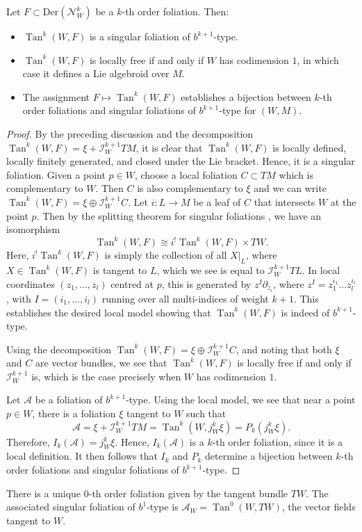 \documentclass[10pt]{amsart}
\newcommand{\Tan}{{\operatorname{Tan}}}
\numberwithin{theoremalpha}{section}
\numberwithin{equation}{section}
\numberwithin{definition}{section}
\numberwithin{theorem}{section}
\numberwithin{proposition}{section}
\numberwithin{lemma}{section}
\numberwithin{example}{section}
\numberwithin{remark}{section}
\numberwithin{corollary}{section}
\numberwithin{question}{section}
\numberwithin{problem}{section}
\numberwithin{assumption}{section}
\theoremstyle{named}
\numberwithin{equation}{section}
\begin{document}
\begin{proposition} \label{Singfoliskorderfol}
Let $F \subset \mathrm{Der}(\mathcal{N}_{W}^{k})$ be a $k$-th order foliation. Then:
\begin{itemize}
\item[a)] $\Tan^{k}(W, F)$ is a singular foliation of $b^{k+1}$-type.
\item[b)] $\Tan^{k}(W, F)$ is locally free if and only if $W$ has codimension $1$, in which case it defines a Lie algebroid over $M$.
\item[c)] The assignment $F \mapsto \Tan^{k}(W, F)$ establishes a bijection between $k$-th order foliations and singular foliations of $b^{k+1}$-type for $(W,M)$. 
\end{itemize}
\end{proposition}
\begin{proof}
By the preceding discussion and the decomposition $\Tan^{k}(W, F) = \xi + \mathcal{I}_W^{k+1} TM$, it is clear that $\Tan^{k}(W, F) $ is locally defined, locally finitely generated, and closed under the Lie bracket. Hence, it is a singular foliation. Given a point $p \in W$, choose a local foliation $C \subset TM$ which is complementary to $W$. Then $C$ is also complementary to $\xi$ and we can write $\Tan^{k}(W, F) = \xi \oplus \mathcal{I}_W^{k+1}C$. Let $i: L \to M$ be a leaf of $C$ that intersects $W$ at the point $p$. Then by the splitting theorem for singular foliations \cite{MR4065067}, we have an isomorphism 
\[
\Tan^{k}(W, F) \cong i^{!}\Tan^{k}(W, F) \times TW. 
\] 
Here, $i^{!}\Tan^{k}(W,F)$ is simply the collection of all $X|_{L}$, where $X \in \Tan^{k}(W, F)$ is tangent to $L$, which we see is equal to $\mathcal{I}_W^{k+1}TL$. In local coordinates $(z_{1}, ..., z_{l})$ centred at $p$, this is generated by $z^{I} \partial_{z_{i}}$, where $z^{I} = z_{1}^{i_{1}} ... z_{l}^{i_{l}}$, with $I = (i_{1}, ..., i_{l})$ running over all multi-indices of weight $k+1$. This establishes the desired local model showing that $\Tan^{k}(W, F)$ is indeed of $b^{k+1}$-type. 

Using the decomposition $\Tan^{k}(W, F) = \xi \oplus \mathcal{I}_W^{k+1}C$, and noting that both $\xi$ and $C$ are vector bundles, we see that $\Tan^{k}(W, F)$ is locally free if and only if $\mathcal{I}_W^{k+1}$ is, which is the case precisely when $W$ has codimension $1$. 

Let $\mathcal{A}$ be a foliation of $b^{k+1}$-type. Using the local model, we see that near a point $p \in W$, there is a foliation $\xi$ tangent to $W$ such that 
\[
\mathcal{A} = \xi + \mathcal{I}_W^{k+1} TM = \Tan^{k}(W, j_{W}^{k}\xi) = P_{k}(j_{W}^{k}\xi). 
\]
Therefore, $I_{k}(\mathcal{A}) = j^{k}_{W}\xi$. Hence, $I_{k}(\mathcal{A})$ is a $k$-th order foliation, since it is a local definition. It then follows that $I_{k}$ and $P_{k}$ determine a bijection between $k$-th order foliations and singular foliations of $b^{k+1}$-type. 
\end{proof}
\begin{remark}
There is a unique $0$-th order foliation given by the tangent bundle $TW$. The associated singular foliation of $b^1$-type is $\mathcal{A}_{W} = \Tan^{0}(W, TW)$, the vector fields tangent to $W$. 
\end{remark}
\end{document}
